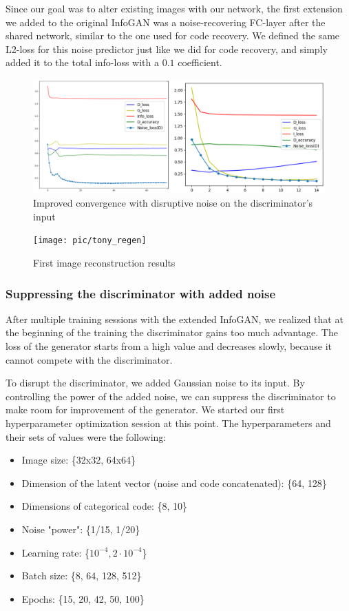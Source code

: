 \documentclass{egpubl}
\begin{document}
Since our goal was to alter existing images with our network, the first extension we added to the original InfoGAN was a noise-recovering FC-layer after the shared network, similar to the one used for code recovery. We defined the same L2-loss for this noise predictor just like we did for code recovery, and simply added it to the total info-loss with a $0.1$ coefficient.

\begin{figure}[!htb]
	\centering
	\includegraphics[width=\linewidth]{pic/added_noise2}
	\caption{Improved convergence with disruptive noise on the discriminator's input}
	\label{fig:added_noise}
\end{figure}

\begin{figure}[!htb]
	\centering
	\texttt{[image: pic/tony\_regen]}
	\caption{First image reconstruction results}
	\label{fig:tony_regen}
\end{figure}

\subsubsection{Suppressing the discriminator with added noise}

After multiple training sessions with the extended InfoGAN, we realized that at the beginning of the training the discriminator gains too much advantage. The loss of the generator starts from a high value and decreases slowly, because it cannot compete with the discriminator.

To disrupt the discriminator, we added Gaussian noise to its input. By controlling the power of the added noise, we can suppress the discriminator to make room for improvement of the generator.
We started our first hyperparameter optimization session at this point. The hyperparameters and their sets of values were the following:

\begin{itemize}
	\item Image size: \{32x32, 64x64\}
	\item Dimension of the latent vector (noise and code concatenated): \{64, 128\}
	\item Dimensions of categorical code: \{8, 10\}
	\item Noise "power": \{1/15, 1/20\}
	\item Learning rate: \{$10^{-4}, 2 \cdot 10^{-4}$\}
	\item Batch size: \{8, 64, 128, 512\}
	\item Epochs: \{15, 20, 42, 50, 100\}
\end{itemize}
\end{document}
